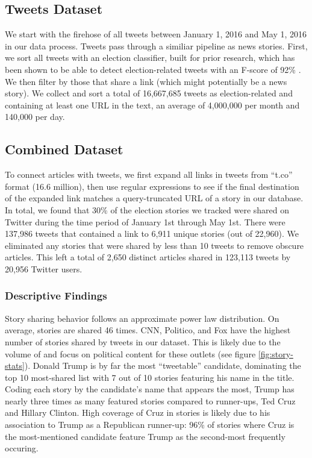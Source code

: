 \documentclass[letterpaper]{article}
\begin{document}
\subsection{Tweets Dataset}
We start with the firehose of all tweets between January 1, 2016 and May 1, 2016 in our data process. Tweets pass through a similiar pipeline as news stories. First, we sort all tweets with an election classifier, built for prior research, which has been shown to be able to detect election-related tweets with an F-score of 92\% \cite{vvr_electome2016}. We then filter by those that share a link (which might potentially be a news story). We collect and sort a total of 16,667,685 tweets as election-related and containing at least one URL in the text, an average of 4,000,000 per month and 140,000 per day.

\subsection{Combined Dataset}
To connect articles with tweets, we first expand all links in tweets from ``t.co'' format (16.6 million), then use regular expressions to see if the final destination of the expanded link matches a query-truncated URL of a story in our database. In total, we found that 30\% of the election stories we tracked were shared on Twitter during the time period of January 1st through May 1st. There were 137,986 tweets that contained a link to 6,911 unique stories (out of 22,960). We eliminated any stories that were shared by less than 10 tweets to remove obscure articles. This left a total of 2,650 distinct articles shared in 123,113 tweets by 20,956 Twitter users.

\subsubsection{Descriptive Findings}
Story sharing behavior follows an approximate power law distribution. On average, stories are shared 46 times. CNN, Politico, and Fox have the highest number of stories shared by tweets in our dataset. This is likely due to the volume of and focus on political content for these outlets (see figure \ref{fig:story-stats}). Donald Trump is by far the most ``tweetable'' candidate, dominating the top 10 most-shared list with 7 out of 10 stories featuring his name in the title. Coding each story by the candidate's name that appears the most, Trump has nearly three times as many featured stories compared to runner-ups, Ted Cruz and Hillary Clinton. High coverage of Cruz in stories is likely due to his association to Trump as a Republican runner-up: 96\% of stories where Cruz is the most-mentioned candidate feature Trump as the second-most frequently occuring.
\end{document}
